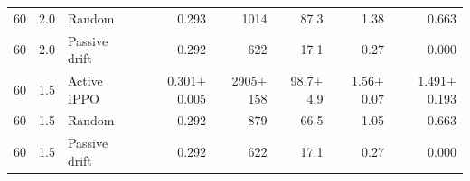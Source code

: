 \begin{table}[p]
{\begin{tabular}{@{}rrlrrrrr@{}}
60 & 2.0 & Random & 0.293 & 1014 & 87.3 & 1.38 & 0.663 \\
60 & 2.0 & Passive drift & 0.292 & 622 & 17.1 & 0.27 & 0.000 \\
\midrule
60 & 1.5 & Active IPPO & 0.301$\pm$0.005 & 2905$\pm$158 & 98.7$\pm$4.9 & 1.56$\pm$0.07 & 1.491$\pm$0.193 \\
60 & 1.5 & Random & 0.292 & 879 & 66.5 & 1.05 & 0.663 \\
60 & 1.5 & Passive drift & 0.292 & 622 & 17.1 & 0.27 & 0.000 \\
\bottomrule
\end{tabular}}
\end{table}
